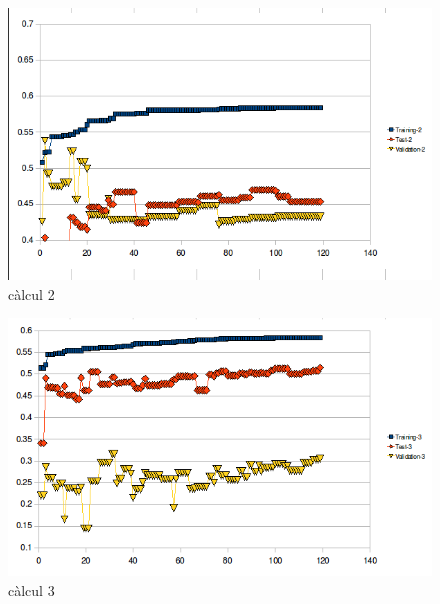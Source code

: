\begin{figure}[h]
\begin{center}
\includegraphics[scale=0.75]{pholus/pholus2.png}
\end{center}
\caption{càlcul 2}
\label{fig:pholusResult2}
\end{figure}

\begin{figure}[h]
\begin{center}
\includegraphics[scale=0.75]{pholus/pholus3.png}
\end{center}
\caption{càlcul 3}
\label{fig:pholusResult3}
\end{figure}

